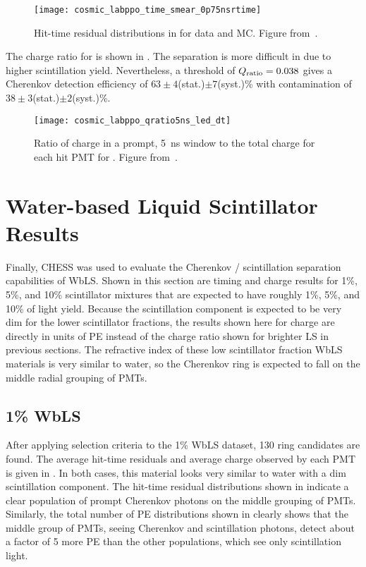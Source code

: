 \begin{figure}
\centering
\texttt{[image: cosmic\_labppo\_time\_smear\_0p75nsrtime]}
\caption{Hit-time residual distributions in {\labppo} for data and MC. Figure from~\cite{chess_lab}.}
\label{fig:labppo}
\end{figure}

The charge ratio for {\labppo} is shown in . 
The separation is more difficult in {\labppo} due to higher scintillation yield.  
Nevertheless, a threshold of $Q_{\rm ratio}=0.038$ gives a Cherenkov detection efficiency of $63\pm4$(stat.)$\pm7$(syst.)\% with contamination of $38\pm3$(stat.)$\pm2$(syst.)\%.

\begin{figure}
\centering
\texttt{[image: cosmic\_labppo\_qratio5ns\_led\_dt]}
\caption{Ratio of charge in a prompt, 5~ns window to the total charge for each hit PMT for {\labppo}. Figure from~\cite{chess_lab}.}
\label{f:labppoQ}
\end{figure}

\clearpage

\section{Water-based Liquid Scintillator Results}
\label{sec:wbls}

Finally, CHESS was used to evaluate the Cherenkov / scintillation separation capabilities of WbLS.
Shown in this section are timing and charge results for 1\%, 5\%, and 10\% scintillator mixtures that are expected to have roughly 1\%, 5\%, and 10\% of {\labppo} light yield.
Because the scintillation component is expected to be very dim for the lower scintillator fractions, the results shown here for charge are directly in units of PE instead of the charge ratio shown for brighter LS in previous sections.
The refractive index of these low scintillator fraction WbLS materials is very similar to water, so the Cherenkov ring is expected to fall on the middle radial grouping of PMTs.

\subsection{1\% WbLS}

After applying selection criteria to the 1\% WbLS dataset, 130 ring candidates are found.
The average hit-time residuals and average charge observed by each PMT is given in .
In both cases, this material looks very similar to water with a dim scintillation component.
The hit-time residual distributions shown in  indicate a clear population of prompt Cherenkov photons on the middle grouping of PMTs.
Similarly, the total number of PE distributions shown in  clearly shows that the middle group of PMTs, seeing Cherenkov and scintillation photons, detect about a factor of 5 more PE than the other populations, which see only scintillation light.


